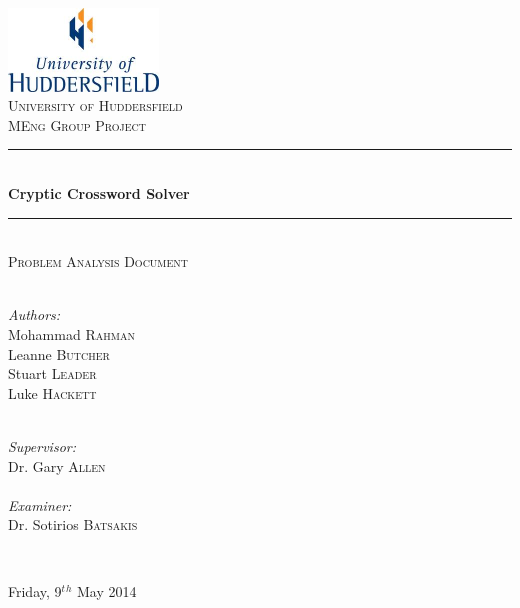 \newcommand{\HRule}{\rule{\linewidth}{0.5mm}}

\begin{titlepage}
  \begin{center}

  \includegraphics[width=0.3\textwidth]{../UoHLogo.jpg} \\[2.5cm]

  \textsc{\LARGE University of Huddersfield} \\[1.5cm]

  \textsc{\Large MEng Group Project} \\[0.75cm]

  \HRule \\[0.4cm]
    { \huge \bfseries Cryptic Crossword Solver }
  \\[0.1cm]

  \HRule \\[0.75cm]

  \textsc{\Large Problem Analysis Document} \\[2cm]

  \begin{minipage}{0.4\textwidth}
    \begin{flushleft} \large ~\\
      \emph{Authors:}\\
      Mohammad \textsc{Rahman} \\
      Leanne \textsc{Butcher} \\
      Stuart \textsc{Leader} \\
      Luke \textsc{Hackett} 
    \end{flushleft}
  \end{minipage}
  \begin{minipage}{0.4\textwidth}
    \begin{flushright} \large ~\\
      \emph{Supervisor:} \\ 
      Dr. Gary \textsc{Allen}
      ~\\ ~\\
      \emph{Examiner:} \\
      Dr. Sotirios \textsc{Batsakis} 
    \end{flushright}
  \end{minipage}

  ~\\[0.01cm]


  \vfill

  {\large Friday, 9$^t$$^h$ May 2014}

  \end{center}
\end{titlepage}
